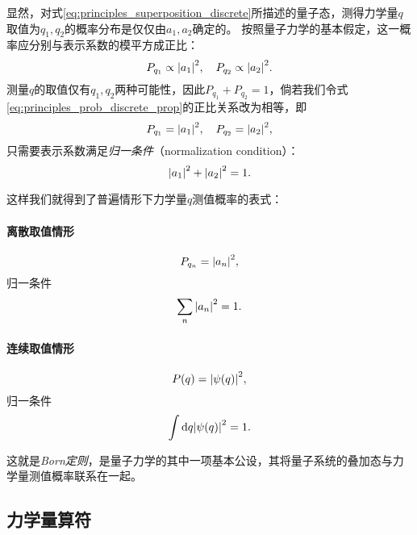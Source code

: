 显然，对式\eqref{eq:principles_superposition_discrete}所描述的量子态，测得力学量$q$取值为$q_1, q_2$的概率分布是仅仅由$a_1, a_2$确定的。
按照量子力学的基本假定，这一概率应分别与表示系数的模平方成正比：
\begin{equation}
    \label{eq:principles_prob_discrete_prop}
    P_{q_1} \propto \abs{a_1}^2, \quad P_{q_2} \propto \abs{a_2}^2.
\end{equation}
测量$q$的取值仅有$q_1, q_2$两种可能性，因此$P_{q_1}+P_{q_2}=1$，倘若我们令式\eqref{eq:principles_prob_discrete_prop}的正比关系改为相等，即
\begin{equation}
    \label{eq:principles_prob_discrete}
    P_{q_1} = \abs{a_1}^2, \quad P_{q_2} = \abs{a_2}^2,
\end{equation}
只需要表示系数满足\emph{归一条件}（normalization condition）：
\begin{equation}
    \label{eq:principles_norm_discrete}
    \abs{a_1}^2 + \abs{a_2}^2 = 1.
\end{equation}

这样我们就得到了普遍情形下力学量$q$测值概率的表式：

\paragraph{离散取值情形}
\begin{equation}
    P_{q_n} = \abs{a_n}^2,
\end{equation}
归一条件
\begin{equation}
    \sum_n{\abs{a_n}^2} = 1.
\end{equation}

\paragraph{连续取值情形}
\begin{equation}
    P(q) = \abs{\psi(q)}^2,
\end{equation}
归一条件
\begin{equation}
    \int \dd q \abs{\psi(q)}^2 = 1.
\end{equation}

这就是\emph{Born定则}，是量子力学的其中一项基本公设，其将量子系统的叠加态与力学量测值概率联系在一起。


\subsection{力学量算符}
\label{subsec:principles_operator}

